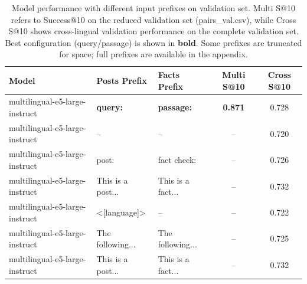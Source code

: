 \documentclass[11pt]{article}
\begin{document}
\begin{table}[t]
  \centering
  \small
  \begin{tabular}{p{4.5cm}p{2cm}p{2cm}cc}
    \hline
    \textbf{Model} & \textbf{Posts Prefix} & \textbf{Facts Prefix} & \textbf{Multi S@10} & \textbf{Cross S@10} \\
    \hline
    multilingual-e5-large-instruct & \textbf{query:} & \textbf{passage:} & \textbf{0.871} & 0.728 \\
    multilingual-e5-large-instruct & -- & -- & -- & 0.720 \\
    multilingual-e5-large-instruct & post: & fact check: & -- & 0.726 \\
    multilingual-e5-large-instruct & This is a post... & This is a fact... & -- & 0.732 \\
    multilingual-e5-large-instruct & <[language]> & -- & -- & 0.722 \\
    multilingual-e5-large-instruct & The following... & The following... & -- & 0.725 \\
    multilingual-e5-large-instruct & This is a post... & This is a fact... & -- & 0.732 \\
    \hline
  \end{tabular}
  \caption{Model performance with different input prefixes on validation set. Multi S@10 refers to Success@10 on the reduced validation set (pairs\_val.csv), while Cross S@10 shows cross-lingual validation performance on the complete validation set. Best configuration (query/passage) is shown in \textbf{bold}. Some prefixes are truncated for space; full prefixes are available in the appendix.}
  \label{tab:model-results-base}
\end{table}
\end{document}

